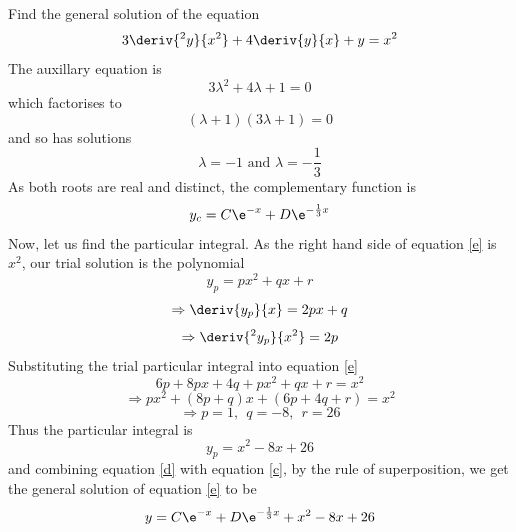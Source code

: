 \documentclass[a4paper,12pt]{article}
\begin{document}
\begin{question}[3]
Find the general solution of the equation
\begin{equation}
\label{e}
3\deriv{^2y}{x^2}+4\deriv{y}{x}+y=x^2
\end{equation}
The auxillary equation is
\begin{equation}
3\lambda^2+4\lambda+1=0
\end{equation}
which factorises to
\begin{equation}
(\lambda+1)(3\lambda+1)=0
\end{equation}
and so has solutions
\begin{equation}
\lambda=-1 \mbox{\ and\ }\lambda=-\frac{1}{3}
\end{equation}
As both roots are real and distinct, the complementary function is
\begin{equation}
\label{d}
y_c=C\e^{-x}+D\e^{-\frac{1}{3}x}
\end{equation}
Now, let us find the particular integral.  As the right hand side of equation \ref{e} is $x^2$, our trial solution is the polynomial
\begin{equation}
y_p=px^2+qx+r
\end{equation}
\begin{equation}
\Rightarrow \deriv{y_p}{x}=2px+q
\end{equation}
\begin{equation}
\Rightarrow \deriv{^2y_p}{x^2}=2p
\end{equation}
Substituting the trial particular integral into equation \ref{e}
\begin{equation}
6p+8px+4q+px^2+qx+r=x^2
\end{equation}
\begin{equation}
\Rightarrow px^2+(8p+q)x+(6p+4q+r)=x^2
\end{equation}
\begin{equation}
\Rightarrow p=1,\ \ q=-8,\ \ r=26
\end{equation}
Thus the particular integral is
\begin{equation}
\label{c}
y_p=x^2-8x+26
\end{equation}
and combining equation \ref{d} with equation \ref{c}, by the rule of superposition, we get the general solution of equation \ref{e} to be
\begin{equation}
y=C\e^{-x}+D\e^{-\frac{1}{3}x}+x^2-8x+26
\end{equation}
\end{question}
\end{document}
